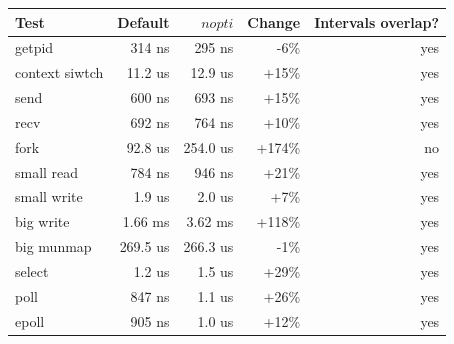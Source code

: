 \begin{tabular}{@{}lrrrr@{}}
\toprule
Test & Default & $nopti$ & Change & Intervals overlap? \\
\midrule
getpid & 314 ns & 295 ns & -6\% & yes \\
context siwtch & 11.2 us & 12.9 us & +15\% & yes \\
send & 600 ns & 693 ns & +15\% & yes \\
recv & 692 ns & 764 ns & +10\% & yes \\
fork & 92.8 us & 254.0 us & +174\% & no \\
small read & 784 ns & 946 ns & +21\% & yes \\
small write & 1.9 us & 2.0 us & +7\% & yes \\
big write & 1.66 ms & 3.62 ms & +118\% & yes \\
big munmap & 269.5 us & 266.3 us & -1\% & yes \\
select & 1.2 us & 1.5 us & +29\% & yes \\
poll & 847 ns & 1.1 us & +26\% & yes \\
epoll & 905 ns & 1.0 us & +12\% & yes \\
\bottomrule
\end{tabular}
